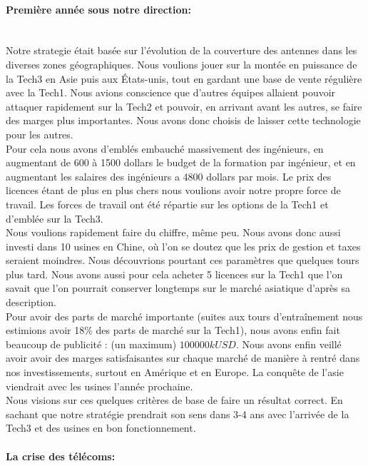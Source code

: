 \paragraph{Première année sous notre direction:}~\\
Notre strategie était basée sur l'évolution de la couverture des
antennes dans les diverses zones géographiques. Nous voulions jouer
sur la montée en puissance de la Tech3 en Asie puis aux États-unis,
tout en gardant une base de vente régulière avec la Tech1. Nous
avions conscience que d'autres équipes allaient pouvoir attaquer 
rapidement sur la Tech2 et pouvoir, en arrivant avant les autres,
se faire des marges plus importantes. Nous avons donc choisis de 
laisser cette technologie pour les autres.\\

Pour cela nous avons d'emblés embauché massivement des ingénieurs, 
en augmentant de 600 à 1500 dollars le budget de la formation par 
ingénieur, et en augmentant les salaires des ingénieurs a 4800
dollars par mois. Le prix des licences étant de plus en plus chers
nous voulions avoir notre propre force de travail.
Les forces de travail ont été répartie sur les options de la Tech1
et d'emblée sur la Tech3.\\

Nous voulions rapidement faire du chiffre, même peu. Nous avons donc 
aussi investi dans 10 usines en Chine, où l'on se doutez que les prix 
de gestion et taxes seraient moindres. Nous découvrions pourtant
ces paramètres que quelques tours plus tard. Nous avons aussi pour cela
acheter 5 licences sur la Tech1 que l'on savait que l'on pourrait 
conserver longtemps sur le marché asiatique d'après sa description.\\
 
Pour avoir des parts de marché importante (suites aux tours d'entraînement
nous estimions avoir 18\% des parts de marché sur la Tech1), nous
avons enfin fait beaucoup de publicité : (un maximum) $100 000 kUSD$.
Nous avons enfin veillé avoir avoir des marges satisfaisantes sur chaque
marché de manière à rentré dans nos investissements, surtout en Amérique
et en Europe. La conquête de l'asie viendrait avec les usines l'année 
prochaine.\\

Nous visions sur ces quelques critères de base de faire un résultat
correct. En sachant que notre stratégie prendrait son sens dans 3-4 ans
avec l'arrivée de la Tech3 et des usines en bon fonctionnement.


\paragraph{La crise des télécoms:}~\\

